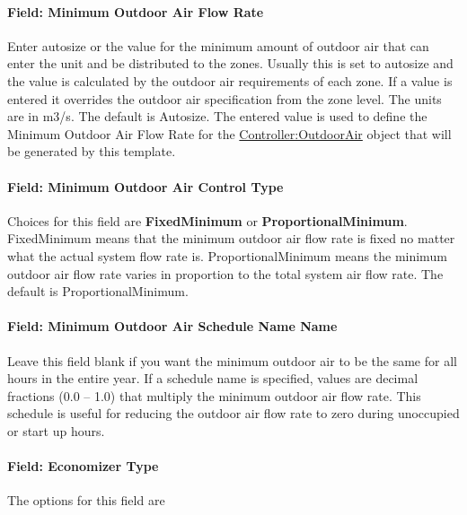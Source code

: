 \paragraph{Field: Minimum Outdoor Air Flow Rate}\label{field-minimum-outdoor-air-flow-rate-6}

Enter autosize or the value for the minimum amount of outdoor air that can enter the unit and be distributed to the zones. Usually this is set to autosize and the value is calculated by the outdoor air requirements of each zone. If a value is entered it overrides the outdoor air specification from the zone level. The units are in m3/s. The default is Autosize. The entered value is used to define the Minimum Outdoor Air Flow Rate for the \hyperref[controlleroutdoorair]{Controller:OutdoorAir} object that will be generated by this template.

\paragraph{Field: Minimum Outdoor Air Control Type}\label{field-minimum-outdoor-air-control-type-2}

Choices for this field are \textbf{FixedMinimum} or \textbf{ProportionalMinimum}. FixedMinimum means that the minimum outdoor air flow rate is fixed no matter what the actual system flow rate is. ProportionalMinimum means the minimum outdoor air flow rate varies in proportion to the total system air flow rate. The default is ProportionalMinimum.

\paragraph{Field: Minimum Outdoor Air Schedule Name Name}\label{field-minimum-outdoor-air-schedule-name-name-1}

Leave this field blank if you want the minimum outdoor air to be the same for all hours in the entire year. If a schedule name is specified, values are decimal fractions (0.0 -- 1.0) that multiply the minimum outdoor air flow rate. This schedule is useful for reducing the outdoor air flow rate to zero during unoccupied or start up hours.

\paragraph{Field: Economizer Type}\label{field-economizer-type-6}

The options for this field are

